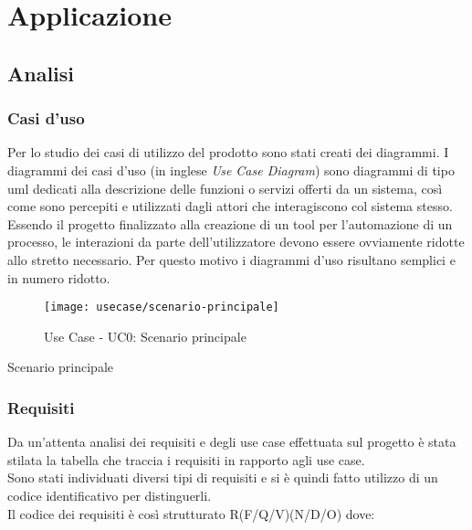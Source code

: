 
\chapter{Applicazione}
\label{cap:applicazione}

\section{Analisi}
\subsection{Casi d'uso}

Per lo studio dei casi di utilizzo del prodotto sono stati creati dei diagrammi.
I diagrammi dei casi d'uso (in inglese \emph{Use Case Diagram}) sono diagrammi di tipo \gls{uml} dedicati alla descrizione delle funzioni o servizi offerti da un sistema, così come sono percepiti e utilizzati dagli attori che interagiscono col sistema stesso.
Essendo il progetto finalizzato alla creazione di un tool per l'automazione di un processo, le interazioni da parte dell'utilizzatore devono essere ovviamente ridotte allo stretto necessario. Per questo motivo i diagrammi d'uso risultano semplici e in numero ridotto.

\begin{figure}[H] 
	\centering 
	\texttt{[image: usecase/scenario-principale]} 
	\caption{Use Case - UC0: Scenario principale}
\end{figure}

\begin{usecase}{0}{Scenario principale}
	\label{uc:scenario-principale}
\end{usecase}

\subsection{Requisiti}

Da un'attenta analisi dei requisiti e degli use case effettuata sul progetto è stata stilata la tabella che traccia i requisiti in rapporto agli use case.\\
Sono stati individuati diversi tipi di requisiti e si è quindi fatto utilizzo di un codice identificativo per distinguerli.\\
Il codice dei requisiti è così strutturato R(F/Q/V)(N/D/O) dove:

